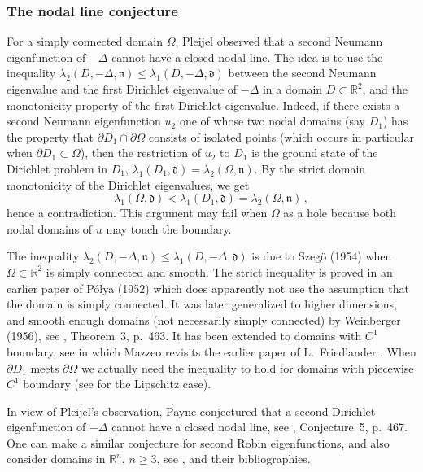 \documentclass[12pt,a4paper]{amsart}
\theoremstyle{plain} %
\theoremstyle{definition}
\numberwithin{equation}{section}
\numberwithin{figure}{section}
\numberwithin{table}{section}
\newcommand{\R}{\mathbb{R}}
\newcommand{\mf}{\mathfrak}
\begin{document}
{\subsubsection{The nodal line conjecture}\label{SSS-hmn-0CB}

For a simply connected domain $\Omega$, Pleijel \cite[p.~546]{Plej1956} observed that a second Neumann eigenfunction of $-\Delta$  cannot have a closed nodal line. The idea is to use the inequality $\lambda_2(D,-\Delta,\mf{n}) \le \lambda_1(D,-\Delta,\mf{d})$ between the second Neumann eigenvalue and the first Dirichlet eigenvalue of $-\Delta$ in a domain $D \subset \R^2$, and the monotonicity property of the first Dirichlet eigenvalue. Indeed, if there exists a second Neumann eigenfunction $u_2$ one of whose two nodal domains (say $D_1$) has the property that $\partial D_1 \cap \partial \Omega$ consists of isolated points  (which occurs in particular when $\partial D_1 \subset \Omega$), then the restriction of $u_2$ to $D_1$ is the ground state of the Dirichlet problem in $D_1$, $\lambda_1(D_1,\mf{d}) = \lambda_2(\Omega,\mf{n})$. By the strict domain monotonicity of the Dirichlet eigenvalues, we get
%
$$
\lambda_1(\Omega,\mf{d}) <  \lambda_1(D_1,\mf{d})=\lambda_2(\Omega,\mf{n})\,,
$$
hence a contradiction. This argument may fail when $\Omega$ as a hole because both nodal domains of $u$ may touch the boundary.\smallskip

The inequality $\lambda_2(D,-\Delta,\mf{n}) \le \lambda_1(D,-\Delta,\mf{d})$ is due to Szeg\"{o} (1954) when $\Omega \subset \R^2$ is simply connected and smooth.  The strict inequality is proved in an earlier paper of P\'{o}lya (1952) which does apparently not use the assumption that the domain is simply connected. It was later generalized to higher dimensions, and smooth enough domains (not necessarily simply connected) by Weinberger (1956), see \cite{Payn1967}, Theorem~3, p.~463. It has been extended to domains with $C^1$ boundary, see \cite{Maz1991} in which Mazzeo revisits the earlier paper of L.~Friedlander \cite{Frie1991}.  When $\partial D_1$ meets $\partial \Omega$ we actually need the inequality to hold for domains with piecewise $C^1$ boundary   (see \cite{ArMa2007,ArMa2012} for the Lipschitz case).
\smallskip

In view of Pleijel's observation, Payne conjectured that a second Dirichlet eigenfunction of $-\Delta$ cannot have a closed nodal line, see \cite{Payn1967}, Conjecture~5, p.~467. One can make a similar conjecture for second Robin eigenfunctions,  and also consider domains in $\R^n$, $n\ge 3$, see \cite{Four2001}, \cite{Ken2013} and their bibliographies.

}
\end{document}
